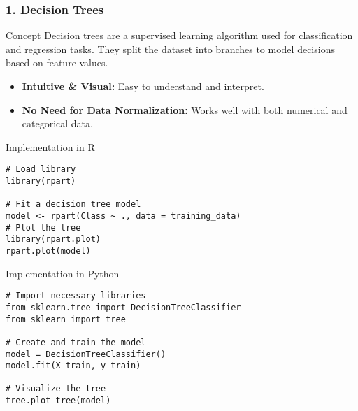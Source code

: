 \documentclass{beamer}
\begin{document}
\begin{frame}[fragile]
    \frametitle{1. Decision Trees}
    \begin{block}{Concept}
        Decision trees are a supervised learning algorithm used for classification and regression tasks. They split the dataset into branches to model decisions based on feature values.
    \end{block}
    
    \begin{itemize}
        \item \textbf{Intuitive \& Visual:} Easy to understand and interpret.
        \item \textbf{No Need for Data Normalization:} Works well with both numerical and categorical data.
    \end{itemize}
    
    \begin{block}{Implementation in R}
        \begin{lstlisting}
# Load library
library(rpart)

# Fit a decision tree model
model <- rpart(Class ~ ., data = training_data)
# Plot the tree
library(rpart.plot)
rpart.plot(model)
        \end{lstlisting}
    \end{block}

    \begin{block}{Implementation in Python}
        \begin{lstlisting}
# Import necessary libraries
from sklearn.tree import DecisionTreeClassifier
from sklearn import tree

# Create and train the model
model = DecisionTreeClassifier()
model.fit(X_train, y_train)

# Visualize the tree
tree.plot_tree(model)
        \end{lstlisting}
    \end{block}
\end{frame}
\end{document}
